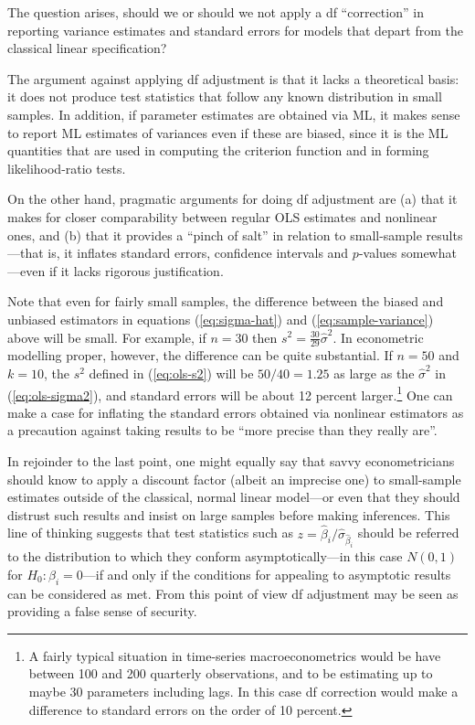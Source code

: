 The question arises, should we or should we not apply a df
``correction'' in reporting variance estimates and standard errors
for models that depart from the classical linear specification?

The argument against applying df adjustment is that it lacks a
theoretical basis: it does not produce test statistics that follow any
known distribution in small samples.  In addition, if parameter
estimates are obtained via ML, it makes sense to report ML estimates
of variances even if these are biased, since it is the ML quantities
that are used in computing the criterion function and in forming
likelihood-ratio tests.

On the other hand, pragmatic arguments for doing df adjustment are (a)
that it makes for closer comparability between regular OLS estimates
and nonlinear ones, and (b) that it provides a ``pinch of salt'' in
relation to small-sample results---that is, it inflates standard
errors, confidence intervals and $p$-values somewhat---even if it
lacks rigorous justification.

Note that even for fairly small samples, the difference between the
biased and unbiased estimators in equations (\ref{eq:sigma-hat}) and
(\ref{eq:sample-variance}) above will be small.  For example, if
$n=30$ then $s^2 = \frac{30}{29} \hat\sigma^2$.  In econometric
modelling proper, however, the difference can be quite substantial.
If $n=50$ and $k=10$, the $s^2$ defined in (\ref{eq:ols-s2}) will be
$50/40 = 1.25$ as large as the $\hat\sigma^2$ in
(\ref{eq:ols-sigma2}), and standard errors will be about 12 percent
larger.\footnote{A fairly typical situation in time-series
  macroeconometrics would be have between 100 and 200 quarterly
  observations, and to be estimating up to maybe 30 parameters
  including lags.  In this case df correction would make a difference
  to standard errors on the order of 10 percent.}  One can make a case
for inflating the standard errors obtained via nonlinear estimators as
a precaution against taking results to be ``more precise than they
really are''.

In rejoinder to the last point, one might equally say that savvy
econometricians should know to apply a discount factor (albeit an
imprecise one) to small-sample estimates outside of the classical,
normal linear model---or even that they should distrust such results
and insist on large samples before making inferences. This line of
thinking suggests that test statistics such as
$z = \hat{\beta}_i/\hat\sigma_{\hat{\beta}_i}$ should be referred to
the distribution to which they conform asymptotically---in this case
$N(0,1)$ for $H_0: \beta_i = 0$---if and only if the conditions for
appealing to asymptotic results can be considered as met.  From this
point of view df adjustment may be seen as providing a false sense of
security.

